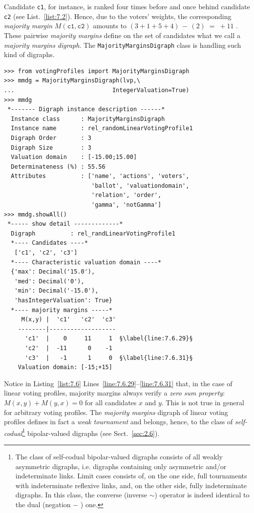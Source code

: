 Candidate \texttt{c1}, for instance, is ranked four times before and once behind candidate \texttt{c2} (see List.~\vref{list:7.2}). Hence, due to the voters' weights, the corresponding \emph{majority margin} $M(\mathtt{c1},\mathtt{c2})$ amounts to  $(3+1+5+4)\, -\,(2)\; =\; +11$ . These pairwise \emph{majority margins} define on the set of candidates what we call a \emph{majority margins digraph}. The \texttt{MajorityMarginsDigraph} class is handling such kind of digraphs.
\begin{lstlisting}[caption={Example of \emph{Majority Margins} digraph},label=list:7.6]
>>> from votingProfiles import MajorityMarginsDigraph
>>> mmdg = MajorityMarginsDigraph(lvp,\
...                            IntegerValuation=True)
>>> mmdg
 *------- Digraph instance description ------*
  Instance class      : MajorityMarginsDigraph
  Instance name       : rel_randomLinearVotingProfile1
  Digraph Order       : 3
  Digraph Size        : 3
  Valuation domain    : [-15.00;15.00]
  Determinateness (%) : 55.56
  Attributes          : ['name', 'actions', 'voters',
                         'ballot', 'valuationdomain',
                         'relation', 'order',
                         'gamma', 'notGamma']
>>> mmdg.showAll()
 *----- show detail -------------*
  Digraph          : rel_randLinearVotingProfile1
  *---- Candidates ----*
   ['c1', 'c2', 'c3']
  *---- Characteristic valuation domain ----*
  {'max': Decimal('15.0'),
   'med': Decimal('0'),
   'min': Decimal('-15.0'),
   'hasIntegerValuation': True}
  *---- majority margins -----*
     M(x,y) |  'c1'   'c2'  'c3'	  
    --------|-------------------
      'c1'  |    0     11     1	 §\label{line:7.6.29}§
      'c2'  |  -11      0    -1	 
      'c3'  |   -1      1     0	 §\label{line:7.6.31}§
    Valuation domain: [-15;+15]
\end{lstlisting}

Notice in Listing~\ref{list:7.6} Lines~\ref{line:7.6.29}--\ref{line:7.6.31} that, in the case of linear voting profiles, majority margins always verify a \emph{zero sum property}: $M(x,y) + M(y,x) = 0$ for all candidates $x$ and $y$. This is not true in general for arbitrary voting profiles. The \emph{majority margins} digraph of linear voting profiles defines in fact a \emph{weak tournament} and belongs, hence, to the class of \emph{self-codual}\footnote{The class of self-codual bipolar-valued digraphs consists of all weakly asymmetric digraphs, i.e. digraphs containing only asymmetric and/or indeterminate links. Limit cases consists of, on the one side, full tournaments with indeterminate reflexive links, and, on the other side, fully indeterminate digraphs. In this class, the converse (inverse $\sim$) operator is indeed identical to the dual (negation $-$ ) one.} bipolar-valued digraphs (see Sect.~\ref{sec:2.6}).
    
